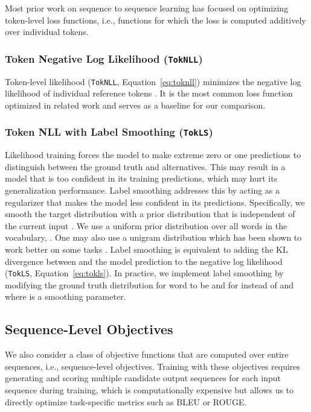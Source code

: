 \documentclass[11pt,a4paper]{article}
\newcommand{\TokNLL}{\texttt{TokNLL}}
\newcommand{\TokLS}{\texttt{TokLS}}
\begin{document}
Most prior work on sequence to sequence learning has focused on optimizing token-level loss functions, i.e., functions for which the loss is computed additively over individual tokens.

\subsubsection*{Token Negative Log Likelihood (\TokNLL)}
\label{sec:toknll}
Token-level likelihood (\TokNLL, Equation~\ref{eq:toknll}) minimizes the negative log likelihood of individual reference tokens .
It is the most common loss function optimized in related work and serves as a baseline for our comparison.

\subsubsection*{Token NLL with Label Smoothing (\TokLS)}
\label{sec:tokls}
Likelihood training forces the model to make extreme zero or one predictions to distinguish between the ground truth and alternatives.
This may result in a model that is too confident in its training predictions, which may hurt its generalization performance.
Label smoothing addresses this by acting as a regularizer that makes the model less confident in its predictions.
Specifically, we smooth the target distribution with a prior distribution  that is independent of the current input  \citep{szegedy2015inception,pereyra2017regularize,vaswani2017transformer}.
We use a uniform prior distribution over all words in the vocabulary, . One may also use a unigram distribution which has been shown to work better on some tasks \citep{pereyra2017regularize}.
Label smoothing is equivalent to adding the KL divergence between  and the model prediction  to the negative log likelihood (\TokLS, Equation~\ref{eq:tokls}).
In practice, we implement label smoothing by modifying the ground truth distribution for word  to be  and  for  instead of  and  where  is a smoothing parameter.

\subsection{Sequence-Level Objectives}
\label{sec:seqobj}

We also consider a class of objective functions that are computed over entire sequences, i.e., sequence-level objectives.
Training with these objectives requires generating and scoring multiple candidate output sequences for each input sequence during training, which is computationally expensive but allows us to directly optimize task-specific metrics such as BLEU or ROUGE.
\end{document}
